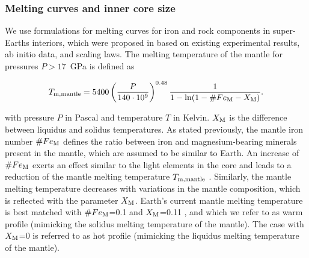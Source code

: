 \documentclass[draft]{agujournal2019} %
\begin{document}
\subsubsection{Melting curves and inner core size}\label{sec:tmelt}
We use formulations for melting curves for iron and rock components in super-Earths interiors, which were proposed in  based on existing experimental results, ab initio data, and scaling laws. The melting temperature of the mantle for pressures $P>17$~GPa is defined as
\begin{linenomath*}
\begin{equation}
T_{\rm m,mantle} = 5400  \left (\frac{P}{140\cdot 10^{\rm 9}}\right )^{0.48} \frac{1}{1 - \ln(1-\#Fe_{\rm M}-X_{\rm M}) }.
\end{equation}
\end{linenomath*}
with pressure $P$ in Pascal and temperature $T$ in Kelvin. 
$X_{\rm M}$ is the difference between liquidus and solidus temperatures. As stated previously, the mantle iron number $\# Fe_{\rm M}$ defines the ratio between iron and magnesium-bearing minerals present in the mantle, which are assumed to be similar to Earth. An increase of $\# Fe_{\rm M}$ exerts an effect similar to the light elements in the core and leads to a reduction of the mantle melting temperature $T_{\rm m, mantle}$ \cite{dorn_outgassing_2018}. Similarly, the mantle melting temperature decreases with variations in the mantle composition, which is reflected with the parameter $X_{\rm M}$. Earth's current mantle melting temperature is best matched with $\# Fe_{\rm M}$=0.1 and $X_{\rm M}$=0.11 \cite{stixrude2014melting}, and which we refer to as warm profile (mimicking the solidus melting temperature of the mantle). The case with $X_{\rm M}$=0 is referred to as hot profile (mimicking the liquidus melting temperature of the mantle).
\end{document}
